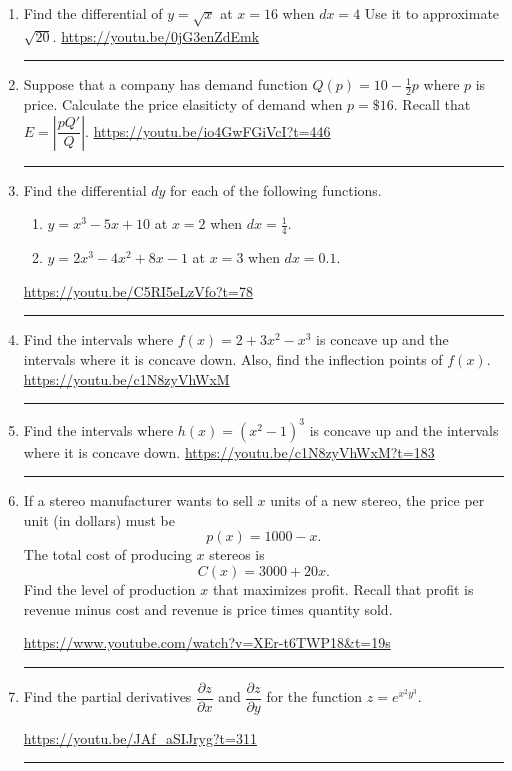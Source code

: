 \documentclass[12pt]{article}
\begin{document}
\begin{enumerate}
\item Find the differential of $y = \sqrt{x}$ at $x = 16$ when $dx = 4$ Use it to approximate $\sqrt{20}$. 
\vfill
\hfill \url{https://youtu.be/0jG3enZdEmk}
\hrule


\item Suppose that a company has demand function $Q(p) = 10 - \frac{1}{2}p$ where $p$ is price.  Calculate the price elasiticty of demand when $p = \$16$. Recall that $E = \left| \dfrac{pQ'}{Q} \right|$. 
\vfill
\hfill \url{https://youtu.be/io4GwFGiVcI?t=446}
\hrule

\item Find the differential $dy$ for each of the following functions. 
\begin{enumerate}
\item $y = x^3 - 5 x + 10$ at $x = 2$ when $dx = \tfrac{1}{4}$. \\ \bigskip
\item $y = 2x^3 - 4x^2 + 8x - 1$ at $ x= 3$ when $dx = 0.1$.
\end{enumerate}
\vfill
\hfill \url{https://youtu.be/C5RI5eLzVfo?t=78}
\hrule



\newpage

\item Find the intervals where $f(x) = 2+3x^2 - x^3$ is concave up and the intervals where it is concave down.  Also, find the inflection points of $f(x)$.  
\vfill
\hfill \url{https://youtu.be/c1N8zyVhWxM}
\hrule

\item Find the intervals where $h(x) = (x^2-1)^3$ is concave up and the intervals where it is concave down.
\vfill
\hfill \url{https://youtu.be/c1N8zyVhWxM?t=183}
\hrule

\item If a stereo manufacturer wants to sell $x$ units of a new stereo, the price per unit (in dollars) must be 
$$p(x) = 1000 - x.$$
The total cost of producing $x$ stereos is 
$$C(x) = 3000 + 20x.$$
Find the level of production $x$ that maximizes profit. Recall that profit is revenue minus cost and revenue is price times quantity sold. 

\vfill
\hfill \url{https://www.youtube.com/watch?v=XEr-t6TWP18&t=19s}
\hrule


\item Find the partial derivatives $\dfrac{\partial z}{\partial x}$ and $\dfrac{\partial z}{\partial y}$ for the function $z= e^{x^2 y^3}.$
%

\vfill
\hfill \url{https://youtu.be/JAf_aSIJryg?t=311}
\hrule

\end{enumerate}
\end{document}
